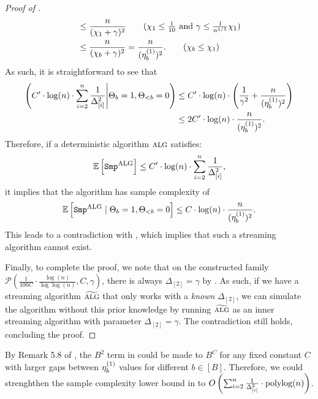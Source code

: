 \begin{proof}[Proof of ]
\begin{align*}
		&\leq \frac{n}{(\chi_{1}+\gamma)^2} \tag{$\chi_{1}\leq \frac{1}{10}$ and $\gamma \leq \frac{1}{n^{1/5}}\chi_{1}$}\\
		&\leq \frac{n}{(\chi_{b}+\gamma)^2} = \frac{n}{(\etaib{1}{b})^2}. \tag{$\chi_{b}\leq \chi_{1}$} 
	\end{align*}
	As such, it is straightforward to see that
	\begin{align*}
		\left(C'\cdot \log(n) \cdot \sum_{i=2}^{n}\frac{1}{\Delta^2_{[i]}} \middle| \Theta_{b}=1, \Theta_{<b}=0\right) &\leq C'\cdot \log(n) \cdot \left(\frac{1}{\gamma^2} + \frac{n}{(\eta^{(1)}_{b})^2}\right)\\
		&\leq 2 C'\cdot \log(n)\cdot \frac{n}{(\eta^{(1)}_{b})^2}.
	\end{align*}
	Therefore, if a deterministic algorithm $\mbox{\sc alg}$ satisfies: 
	\[\operatorname*{{\mathbb{E}}}\left[\mathtt{Smp^{\mbox{\sc alg}}}\right] \leq C' \cdot \log(n)\cdot \sum_{i=2}^{n}\frac{1}{\Delta^2_{[i]}},\] it implies that the algorithm has sample complexity of 
	\[\operatorname*{{\mathbb{E}}}\left[\mathtt{Smp^{\mbox{\sc alg}}} \mid \Theta_{b}=1, \Theta_{<b}=0\right]\leq C \cdot \log(n) \cdot \frac{n}{(\eta^{(1)}_{b})^2}.\]
	This leads to a contradiction with , which implies that such a streaming algorithm cannot exist.
	
	Finally, to complete the proof, we note that on the constructed family $\mathcal{P}(\frac{1}{100C}\cdot \frac{\log(n)}{\log\log(n)}, C, \gamma)$, there is always $\Delta_{[2]}=\gamma$ by . As such, if we have a streaming algorithm $\widetilde{\mbox{\sc alg}}$ that only works with a \emph{known} $\Delta_{[2]}$, we can simulate the algorithm without this prior knowledge by running $\widetilde{\mbox{\sc alg}}$ as an inner streaming algorithm with parameter $\Delta_{[2]}=\gamma$. The contradiction still holds, concluding the proof.
\end{proof}


\begin{remark}
	By Remark 5.8 of \cite{AW23BestArm}, the $B^2$ term in  could be made to $B^C$ for any fixed constant $C$ with larger gaps between $\eta^{(1)}_{b}$ values for different $b\in[B]$. Therefore, we could strenghthen the sample complexity lower bound in  to $O\left(\sum_{i=2}^{n} \frac{1}{\Delta^2_{[i]}} \cdot \textnormal{polylog}(n)\right)$.
\end{remark}
